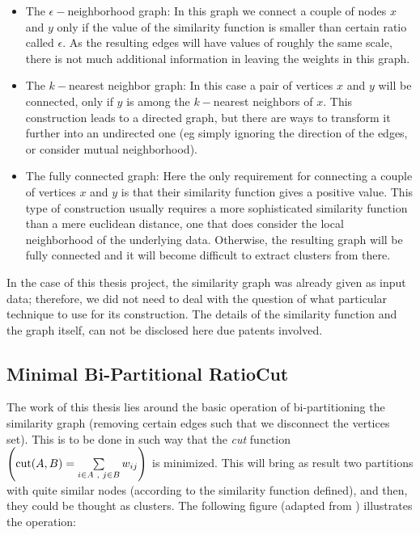 \begin{itemize}
  \item The $\epsilon-$neighborhood graph: In this graph we connect a
    couple of nodes $x$ and $y$ only if the value of the similarity
    function is smaller than certain ratio called $\epsilon$. As the
    resulting edges will have values of roughly the same scale, there
    is not much additional information in leaving the weights in this
    graph. \\
  \item The $k-$nearest neighbor graph: In this case a pair of
    vertices $x$ and $y$ will be connected, only if $y$ is among the
    $k-$nearest neighbors of $x$. This construction leads to a
    directed graph, but there are ways to transform it further into an
    undirected one (eg simply ignoring the direction of the edges, or
    consider mutual neighborhood). \\
  \item The fully connected graph: Here the only requirement for
    connecting a couple of vertices $x$ and $y$ is that their
    similarity function gives a positive value. This type of
    construction usually requires a more sophisticated similarity
    function than a mere euclidean distance, one that does consider
    the local neighborhood of the underlying data. Otherwise, the
    resulting graph will be fully connected and it will become
    difficult to extract clusters from there. 
\end{itemize}
\joinbelow{1cm}

In the case of this thesis project, the similarity graph was already
given as input data; therefore, we did not need to deal with the
question of what particular technique to use for its construction. The
details of the similarity function and the graph itself, can not be
disclosed here due patents involved.

\subsection{Minimal Bi-Partitional RatioCut}

The work of this thesis lies around the basic operation of
bi-partitioning the similarity graph (removing certain edges such that we
disconnect the vertices set). This is to be done in such way that the
\emph{cut} function $\left(\operatorname{cut}(A,B) = \sum\limits_{\tiny{i \in A
    \ensuremath{\,\,,\,\,} j \in B}} w_{ij}\right)$ is minimized. This will bring as result
two partitions with quite similar nodes (according to the similarity
function defined), and then, they could be thought as clusters. The
following figure (adapted from \cite{gao13}) illustrates the
operation:

